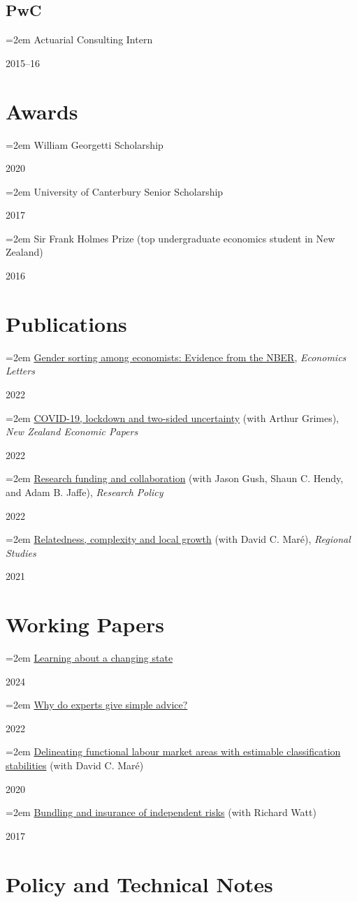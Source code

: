 \documentclass[11pt,oneside]{memoir}
\newcommand{\entry}[2]{\par\parbox[t]{0.9\linewidth}{\strut\raggedright\hangindent=2em #2\strut}\hfill#1}
\begin{document}
\subsection{PwC}
\entry{2015--16}{Actuarial Consulting Intern}

\section{Awards}

\entry{2020}{William Georgetti Scholarship}
\entry{2017}{University of Canterbury Senior Scholarship}
\entry{2016}{Sir Frank Holmes Prize (top undergraduate economics student in New Zealand)}

\section{Publications}

\entry{2022}{\href{https://doi.org/10.1016/j.econlet.2022.110640}{Gender sorting among economists: Evidence from the NBER}, \emph{Economics Letters}}
\entry{2022}{\href{https://doi.org/10.1080/00779954.2020.1806340}{COVID-19, lockdown and two-sided uncertainty} (with Arthur Grimes), \emph{New Zealand Economic Papers}}
\entry{2022}{\href{https://doi.org/10.1016/j.respol.2021.104421}{Research funding and collaboration} (with Jason Gush, Shaun C. Hendy, and Adam B. Jaffe), \emph{Research Policy}}
\entry{2021}{\href{https://doi.org/10.1080/00343404.2020.1802418}{Relatedness, complexity and local growth} (with David C. Maré), \emph{Regional Studies}}

\section{Working Papers}

\entry{2024}{\href{https://arxiv.org/abs/2401.03607}{Learning about a changing state}}
\entry{2022}{\href{https://arxiv.org/abs/2209.11710}{Why do experts give simple advice?}}
\entry{2020}{\href{https://www.iza.org/publications/dp/13642}{Delineating functional labour market areas with estimable classification stabilities} (with David C. Maré)}
\entry{2017}{\href{https://ideas.repec.org/p/cbt/econwp/17-05.html}{Bundling and insurance of independent risks} (with Richard Watt)}

\section{Policy and Technical Notes}
\end{document}
